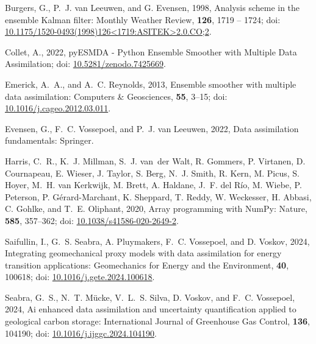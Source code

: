 \documentclass[a4paper, colorlinks=false, 11pt, parskip=half,
               notitlepage, oneside, fleqn, pdftex]{scrartcl}
\begin{document}
\begin{thebibliography}{}
\itemsep0pt

Burgers, G., P.~J. van Leeuwen, and G. Evensen,  1998, Analysis scheme in the
  ensemble {K}alman filter: Monthly Weather Review, {\bfseries 126}, 1719 --
  1724; doi:
  \href{https://doi.org/10.1175/1520-0493(1998)126<1719:ASITEK>2.0.CO;2}{10.1175/1520-0493(1998)126<1719:ASITEK>2.0.CO;2}.

Collet, A.,  2022, {pyESMDA - Python Ensemble Smoother with Multiple Data
  Assimilation}; doi:
  \href{https://doi.org/10.5281/zenodo.7425669}{10.5281/zenodo.7425669}.

Emerick, A.~A., and A.~C. Reynolds,  2013, Ensemble smoother with multiple data
  assimilation: Computers \& Geosciences, {\bfseries 55}, 3--15; doi:
  \href{https://doi.org/10.1016/j.cageo.2012.03.011}{10.1016/j.cageo.2012.03.011}.

Evensen, G., F.~C. Vossepoel, and P.~J. van Leeuwen,  2022, Data assimilation
  fundamentals: Springer.

Harris, C.~R., K.~J. Millman, S.~J. van~der Walt, R. Gommers, P. Virtanen, D.
  Cournapeau, E. Wieser, J. Taylor, S. Berg, N.~J. Smith, R. Kern, M. Picus, S.
  Hoyer, M.~H. van Kerkwijk, M. Brett, A. Haldane, J.~F. del R{\'{i}}o, M.
  Wiebe, P. Peterson, P. G{\'{e}}rard-Marchant, K. Sheppard, T. Reddy, W.
  Weckesser, H. Abbasi, C. Gohlke, and T.~E. Oliphant,  2020, Array programming
  with {NumPy}: Nature, {\bfseries 585}, 357--362; doi:
  \href{https://doi.org/10.1038/s41586-020-2649-2}{10.1038/s41586-020-2649-2}.

Saifullin, I., G.~S. Seabra, A. Pluymakers, F.~C. Vossepoel, and D. Voskov,
  2024, Integrating geomechanical proxy models with data assimilation for
  energy transition applications: Geomechanics for Energy and the Environment,
  {\bfseries 40}, 100618; doi:
  \href{https://doi.org/10.1016/j.gete.2024.100618}{10.1016/j.gete.2024.100618}.

Seabra, G.~S., N.~T. Mücke, V.~L.~S. Silva, D. Voskov, and F.~C. Vossepoel,
  2024, Ai enhanced data assimilation and uncertainty quantification applied to
  geological carbon storage: International Journal of Greenhouse Gas Control,
  {\bfseries 136}, 104190; doi:
  \href{https://doi.org/10.1016/j.ijggc.2024.104190}{10.1016/j.ijggc.2024.104190}.


\end{thebibliography}
\end{document}

